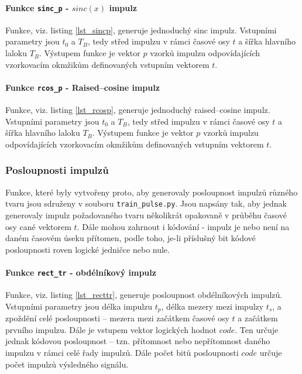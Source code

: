 

\paragraph{Funkce \texttt{sinc\_p} - $sinc(x)$ impulz}
Funkce, viz. listing \ref{lst_sincp}, generuje jednoduchý sinc impulz. Vstupními parametry jsou $t_{0}$ a $T_{B}$, tedy střed impulzu v rámci časové osy $t$ a šířka hlavního laloku $T_B$. Výstupem funkce je vektor $p$ vzorků impulzu odpovídajících vzorkovacím okmžikům definovaných vstupním vektorem $t$.



\paragraph{Funkce \texttt{rcos\_p} - Raised--cosine impulz}
Funkce, viz. listing \ref{lst_rcosp}, generuje jednoduchý raised--cosine impulz. Vstupními parametry jsou $t_{0}$ a $T_{B}$, tedy střed impulzu v rámci časové osy $t$ a šířka hlavního laloku $T_B$. Výstupem funkce je vektor $p$ vzorků impulzu odpovídajících vzorkovacím okmžikům definovaných vstupním vektorem $t$.



\subsubsection{Posloupnosti impulzů}

Funkce, které byly vytvořeny proto, aby generovaly posloupnost impulzů různého tvaru jsou sdruženy v souboru \texttt{train\_pulse.py}. Jsou napsány tak, aby jednak generovaly impulz požadovaného tvaru několikrát opakovaně v průběhu časové osy cané vektorem $t$. Dále mohou zahrnout i kódování - impulz je nebo není na daném časovém úseku přítomen, podle toho, je-li příslušný bit kódové posloupnosti roven logické jedničce nebo nule. 

\paragraph{Funkce \texttt{rect\_tr} - obdélníkový impulz}
Funkce, viz. listing \ref{lst_recttr}, generuje posloupnost obdélníkových impulzů. Vstupními parametry jsou délka impulzu $t_{p}$, délka mezery mezi impulzy $t_{s}$, a zpoždění celé posloupnosti -- mezera mezi začátkem časové osy $t$ a začátkem prvního impulzu. Dále je vstupem vektor logických hodnot $code$. Ten určuje jednak kódovou posloupnost -- tzn. přítomnost nebo nepřítomnost daného impulzu v rámci celé řady impulzů. Dále počet bitů posloupnosti $code$ určuje počet impulzů výsledného signálu.


